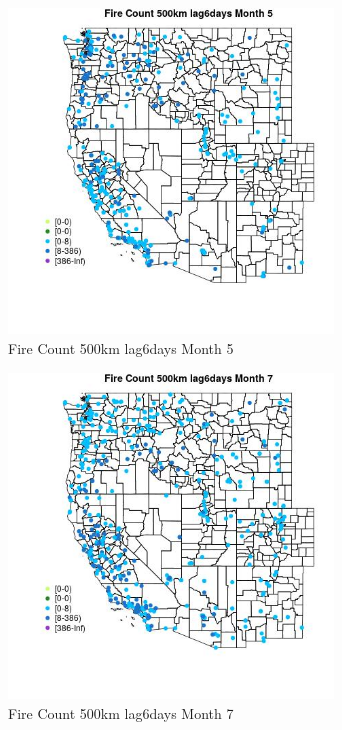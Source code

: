 \begin{figure} 
\centering  
\includegraphics[width=0.77\textwidth]{Code_Outputs/Report_ML_input_PM25_Step4_part_e_de_duplicated_aves_compiled_2019-05-18wNAs_MapObsMo5Fire_Count_500km_lag6days.jpg} 
\caption{\label{fig:Report_ML_input_PM25_Step4_part_e_de_duplicated_aves_compiled_2019-05-18wNAsMapObsMo5Fire_Count_500km_lag6days}Fire Count 500km lag6days Month 5} 
\end{figure} 
 

\clearpage 

\begin{figure} 
\centering  
\includegraphics[width=0.77\textwidth]{Code_Outputs/Report_ML_input_PM25_Step4_part_e_de_duplicated_aves_compiled_2019-05-18wNAs_MapObsMo7Fire_Count_500km_lag6days.jpg} 
\caption{\label{fig:Report_ML_input_PM25_Step4_part_e_de_duplicated_aves_compiled_2019-05-18wNAsMapObsMo7Fire_Count_500km_lag6days}Fire Count 500km lag6days Month 7} 
\end{figure} 
 

